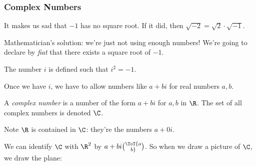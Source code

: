 
\begin{frame}
\frametitle{Complex Numbers}

It makes us sad that $-1$ has no square root.
\pause
If it did, then $\sqrt{-2} = \sqrt{2}\cdot\sqrt{-1}$.

\pause\medskip
\alert{Mathematician's solution:} we're just not using enough numbers!
\pause
We're going to declare by \emph{fiat} that there exists a square root of $-1$.

\pause
\begin{defn}
  The number $i$ is defined such that $i^2 = -1$.
\end{defn}

\pause
Once we have $i$, we have to allow numbers like $a+bi$ for real numbers $a,b$.

\pause
\begin{defn}
  A \emph{complex number} is a number of the form $a+bi$ for $a,b$ in $\R$.
  The set of all complex numbers is denoted $\C$.
\end{defn}

\pause\medskip
Note $\R$ is contained in $\C$: they're the numbers $a + 0i$.

\pause\medskip
We can identify $\C$ with $\R^2$ by $a+bi \ToT {a\choose b}$.
\pause
So when we draw a picture of $\C$, we draw the plane:\\
\hfill
{}
\hfill\null

\end{frame}



